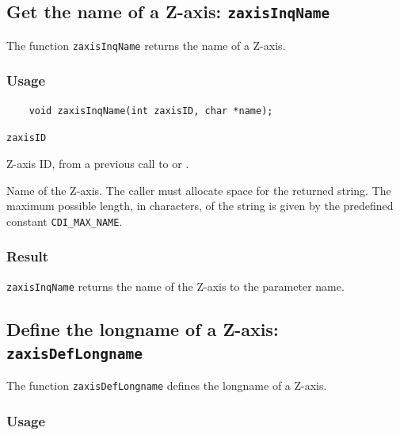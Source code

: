 \subsection{Get the name of a Z-axis: \texttt{zaxisInqName}}
\label{zaxisInqName}

The function {\texttt{zaxisInqName}} returns the name of a Z-axis.

\subsubsection*{Usage}

\begin{verbatim}
    void zaxisInqName(int zaxisID, char *name);
\end{verbatim}

\hspace*{4mm}\begin{minipage}[]{15cm}
\begin{deflist}{\texttt{zaxisID}\ }
\item[\texttt{zaxisID}]
Z-axis ID, from a previous call to {} or {}.
\item[\texttt{name}]
Name of the Z-axis. The caller must allocate space for the
                    returned string. The maximum possible length, in characters, of
                    the string is given by the predefined constant {\texttt{CDI\_MAX\_NAME}}.

\end{deflist}
\end{minipage}

\subsubsection*{Result}

{\texttt{zaxisInqName}} returns the name of the Z-axis to the parameter name.



\subsection{Define the longname of a Z-axis: \texttt{zaxisDefLongname}}
\label{zaxisDefLongname}

The function {\texttt{zaxisDefLongname}} defines the longname of a Z-axis.

\subsubsection*{Usage}

